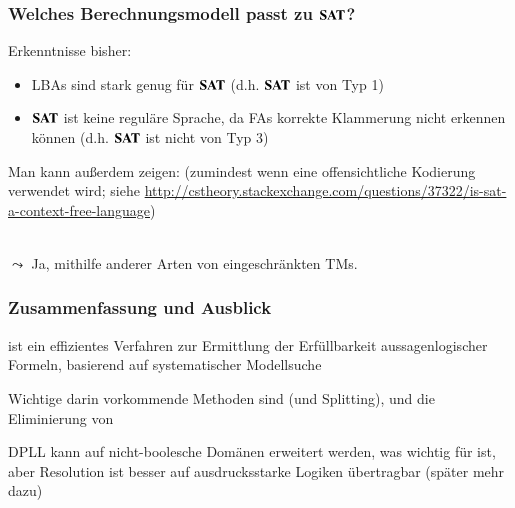 \documentclass[aspectratio=1610,onlymath]{beamer}
\let\beameroriginaldoublebackslash\\
\let\\=\beameroriginaldoublebackslash
\begin{document}
\begin{frame}\frametitle{Welches Berechnungsmodell passt zu $\textbf{\textcolor{black}{SAT}}$?}

Erkenntnisse bisher:
\begin{itemize}
\item LBAs sind stark genug für $\textbf{\textcolor{black}{SAT}}$ (d.h. $\textbf{\textcolor{black}{SAT}}$ ist von Typ 1)
\item $\textbf{\textcolor{black}{SAT}}$ ist keine reguläre Sprache, da FAs korrekte Klammerung nicht erkennen können (d.h. $\textbf{\textcolor{black}{SAT}}$ ist nicht von Typ 3)
\end{itemize}\bigskip\pause

Man kann außerdem zeigen:
(zumindest wenn eine offensichtliche Kodierung verwendet wird; siehe
\url{http://cstheory.stackexchange.com/questions/37322/is-sat-a-context-free-language})
\bigskip\pause

\\\pause
$\leadsto$ Ja, mithilfe anderer Arten von eingeschränkten TMs.

\end{frame}


\begin{frame}\frametitle{Zusammenfassung und Ausblick}

 ist ein effizientes Verfahren zur Ermittlung der Erfüllbarkeit aussagenlogischer Formeln,
basierend auf systematischer Modellsuche
\bigskip

Wichtige darin vorkommende Methoden sind  (und Splitting),  und
die Eliminierung von \bigskip

DPLL kann auf nicht-boolesche Domänen erweitert werden, was wichtig für  ist, aber Resolution ist besser
auf ausdrucksstarke Logiken übertragbar (später mehr dazu)
\bigskip

\end{frame}
\end{document}

